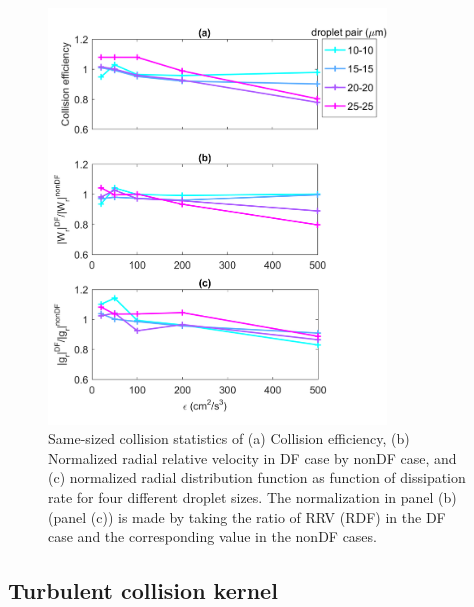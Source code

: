 \begin{figure}[ht]
\centering
\includegraphics[width=0.8\textwidth]{Figures/Chap3/samesize.png}
\caption{Same-sized collision statistics of (a) Collision efficiency, (b) Normalized radial relative velocity in DF case by nonDF case, and (c) normalized radial distribution function as function of dissipation rate for four different droplet sizes. The normalization in panel (b) (panel (c)) is made by taking the ratio of RRV (RDF) in the DF case and the corresponding value in the nonDF cases. } \label{fig:samesize}
\end{figure}


\subsection{Turbulent collision kernel} \label{sec:ch3_reTCK}

